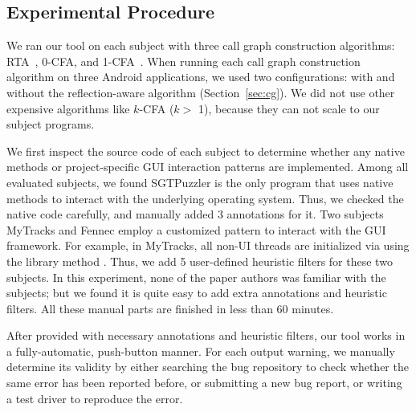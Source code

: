 \subsection{Experimental Procedure}
\label{sec:procedural}

We ran our tool on each subject with three call graph construction
algorithms: RTA~\cite{rta}, 0-CFA, and 1-CFA~\cite{kcfa}.  When running
each call graph construction algorithm on three Android applications, we
used two configurations: with and without the reflection-aware algorithm 
(Section~\ref{sec:cg}).  We did not use other expensive algorithms like $k$-CFA ($k >$ 1),
because they can not scale to our subject programs.

We first inspect the source code of each subject to determine whether any
native methods or project-specific GUI interaction patterns are implemented.
Among all evaluated subjects, we found SGTPuzzler is the only program that
uses native methods to interact with
the underlying operating system. Thus, we checked the native code carefully,
and manually added 3 
annotations for it. Two subjects MyTracks and Fennec employ a customized pattern
to interact with the GUI framework. For example, in MyTracks, all non-UI
threads are initialized via using the library method .
Thus, we add 5 user-defined heuristic filters for these two subjects.%
In this experiment, none of the paper
authors was familiar with the subjects; but we found it is quite easy
to add extra annotations and heuristic filters. All these
manual parts are finished in less than 60 minutes.

After provided with necessary annotations and heuristic filters,
our tool works in a fully-automatic, push-button manner. For each output
warning, we manually determine its validity by either searching the
bug repository to check whether the same error has been reported before,
or submitting a new bug report, or writing a test driver to reproduce
the error.



